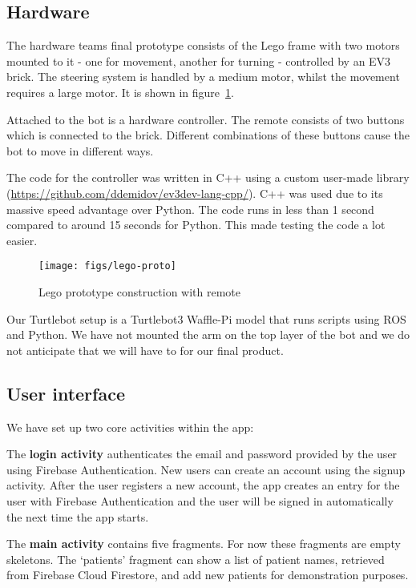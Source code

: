 \documentclass{article}
\begin{document}
\subsection{Hardware}

The hardware teams final prototype consists of the Lego frame with two motors mounted to it - one for movement, another for turning - controlled by an EV3 brick. The steering system is handled by a medium motor, whilst the movement requires a large motor. It is shown in figure~\ref{fig:lego-proto}.

Attached to the bot is a hardware controller. The remote consists of two buttons which is connected to the brick. Different combinations of these buttons cause the bot to move in different ways.

The code for the controller was written in C++ using a custom user-made library (\url{https://github.com/ddemidov/ev3dev-lang-cpp/}). C++ was used due to its massive speed advantage over Python. The code runs in less than 1 second compared to around 15 seconds for Python. This made testing the code a lot easier.

\begin{figure}[tb]
\vskip 5mm
\begin{center}
\centerline{\texttt{[image: figs/lego-proto]}}
\caption{Lego prototype construction with remote}
\label{fig:lego-proto}
\end{center}
\vskip -5mm
\end{figure}

Our Turtlebot setup is a Turtlebot3 Waffle-Pi model that runs scripts using ROS and Python. We have not mounted the arm on the top layer of the bot and we do not anticipate that we will have to for our final product. 

\subsection{User interface}
We have set up two core activities within the app:

The {\bf login activity} authenticates the email and password provided by the user using Firebase Authentication. New users can create an account using the signup activity. After the user registers a new account, the app creates an entry for the user with Firebase Authentication and the user will be signed in automatically the next time the app starts.

The {\bf main activity} contains five fragments. For now these fragments are empty skeletons. The `patients' fragment can show a list of patient names, retrieved from Firebase Cloud Firestore, and add new patients for demonstration purposes.
\end{document}
